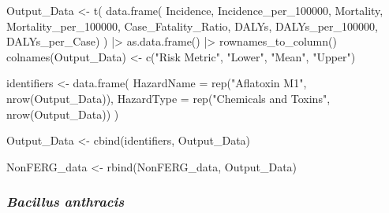 \documentclass[
  letterpaper,
  DIV=11,
  numbers=noendperiod]{scrartcl}
\newenvironment{Shaded}{\begin{snugshade}}{\end{snugshade}}
\newcommand{\AttributeTok}[1]{\textcolor[rgb]{0.40,0.45,0.13}{#1}}
\newcommand{\FunctionTok}[1]{\textcolor[rgb]{0.28,0.35,0.67}{#1}}
\newcommand{\NormalTok}[1]{\textcolor[rgb]{0.00,0.23,0.31}{#1}}
\newcommand{\OtherTok}[1]{\textcolor[rgb]{0.00,0.23,0.31}{#1}}
\newcommand{\SpecialCharTok}[1]{\textcolor[rgb]{0.37,0.37,0.37}{#1}}
\newcommand{\StringTok}[1]{\textcolor[rgb]{0.13,0.47,0.30}{#1}}
\begin{document}
\begin{Shaded}
\begin{Highlighting}[]
\NormalTok{Output\_Data }\OtherTok{\textless{}{-}} \FunctionTok{t}\NormalTok{(}
 \FunctionTok{data.frame}\NormalTok{(}
\NormalTok{ Incidence,  Incidence\_per\_100000, }
\NormalTok{ Mortality,  Mortality\_per\_100000, }
\NormalTok{ Case\_Fatality\_Ratio, }
\NormalTok{ DALYs,  DALYs\_per\_100000,  DALYs\_per\_Case)}
\NormalTok{ ) }\SpecialCharTok{|\textgreater{}} 
 \FunctionTok{as.data.frame}\NormalTok{() }\SpecialCharTok{|\textgreater{}} 
 \FunctionTok{rownames\_to\_column}\NormalTok{()}
\FunctionTok{colnames}\NormalTok{(Output\_Data) }\OtherTok{\textless{}{-}} \FunctionTok{c}\NormalTok{(}\StringTok{"Risk Metric"}\NormalTok{,  }\StringTok{"Lower"}\NormalTok{,  }\StringTok{"Mean"}\NormalTok{,  }\StringTok{"Upper"}\NormalTok{)}

\NormalTok{identifiers }\OtherTok{\textless{}{-}} \FunctionTok{data.frame}\NormalTok{(}
 \AttributeTok{HazardName =} \FunctionTok{rep}\NormalTok{(}\StringTok{"Aflatoxin M1"}\NormalTok{,  }\FunctionTok{nrow}\NormalTok{(Output\_Data)), }
 \AttributeTok{HazardType =} \FunctionTok{rep}\NormalTok{(}\StringTok{"Chemicals and Toxins"}\NormalTok{,  }\FunctionTok{nrow}\NormalTok{(Output\_Data))}
\NormalTok{ )}
        
\NormalTok{Output\_Data }\OtherTok{\textless{}{-}} \FunctionTok{cbind}\NormalTok{(identifiers,  Output\_Data)}

\NormalTok{NonFERG\_data }\OtherTok{\textless{}{-}} \FunctionTok{rbind}\NormalTok{(NonFERG\_data, Output\_Data)}
\end{Highlighting}
\end{Shaded}

\subsubsection{\texorpdfstring{\emph{Bacillus
anthracis}}{Bacillus anthracis}}\label{bacillus-anthracis}
\end{document}
